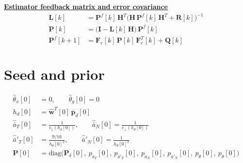 \documentclass[11pt,a4paper]{ctexart}
\newcommand{\hd}[1]{\par\bigskip\noindent\underline{\textbf{#1}}}
\newcommand{\bp}{\bar{\mathbf p}}
\newcommand{\wh}{\hat{\mathbf w}}
\newcommand{\aT}{\bar a_T}
\newcommand{\aN}{\bar a_N}
\newcommand{\haT}{\hat{\bar a}_T}
\newcommand{\haN}{\hat{\bar a}_N}
\newcommand{\apT}{\bar a'_T}
\newcommand{\apN}{\bar a'_N}
\newcommand{\hapT}{\hat{\bar a}'_T}
\newcommand{\hapN}{\hat{\bar a}'_N}
\newcommand{\I}{\mathbf I}
\begin{document}
\hd{Estimator feedback matrix and error covariance}
\begin{align*}
\mathbf L[k] &= \mathbf P^f[k]\,\mathbf H^{T}\big(\mathbf H\,\mathbf P^f[k]\,\mathbf H^{T} + \mathbf R[k]\big)^{-1} \\
\mathbf P[k] &= \big(\I - \mathbf L[k]\,\mathbf H\big)\,\mathbf P^f[k] \\
\mathbf P^f[k+1] &= \mathbf F_e[k]\,\mathbf P[k]\,\mathbf F_e^{T}[k] + \mathbf Q[k]
\end{align*}

\section*{Seed and prior}
\begin{align*}
\hat\theta_x[0] &= 0, \qquad \hat\theta_y[0] = 0 \\
h_d[0] &= \wh^{T}[0]\,\bp_d[0] \\
\haT[0] &= \frac{1}{c_\parallel(h_d[0])}, \qquad \haN[0] = \frac{1}{c_\perp(h_d[0])} \\
\hapT[0] &= \frac{9/16}{h_d[0]^{2}}, \qquad \hapN[0] = \frac{1}{h_d[0]^{2}} \\
\mathbf P[0] &= \mathrm{diag}\big(\mathbf P_{\delta}[0],\ p_{\aT}[0],\ p_{\apT}[0],\ p_{\aN}[0],\ p_{\apN}[0],\ p_\theta[0],\ p_\theta[0]\big)
\end{align*}
\end{document}
